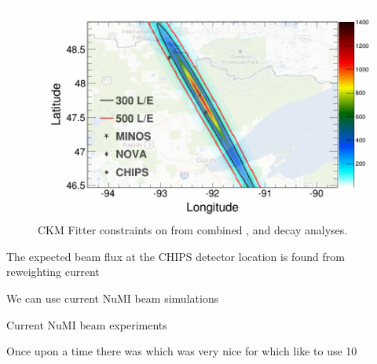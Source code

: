 \begin{figure}
    \includegraphics[width=\largefigwidth]{diagrams/numi_map}
    \caption[CKM Fitter constraints on \alphaCKM.]%
    {CKM Fitter constraints on \alphaCKM from combined \BToPiPi,
        \BToRhoPi and \BToRhoRho decay analyses.}
    \label{fig:numi_map}
\end{figure}

The expected beam flux at the CHIPS detector location is found from reweighting current

We can use current NuMI beam simulations

Current NuMI beam experiments


Once upon a time there was \chips which was very nice for \nova which like to use \unit{10}{\GeV}
